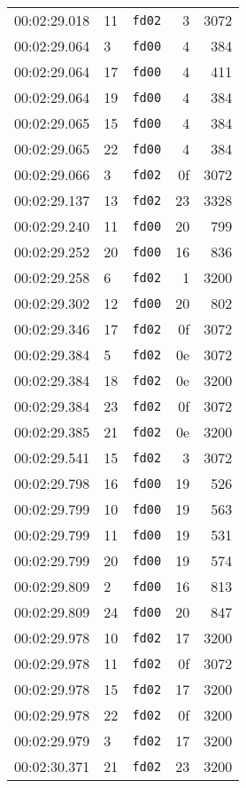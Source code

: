 \documentclass{article}
\begin{document}
\begin{longtable}{lllrr}
00:02:29.018 & 11 & \texttt{fd02} & 3 & 3072 \\
00:02:29.064 & 3 & \texttt{fd00} & 4 & 384 \\
00:02:29.064 & 17 & \texttt{fd00} & 4 & 411 \\
00:02:29.064 & 19 & \texttt{fd00} & 4 & 384 \\
00:02:29.065 & 15 & \texttt{fd00} & 4 & 384 \\
00:02:29.065 & 22 & \texttt{fd00} & 4 & 384 \\
00:02:29.066 & 3 & \texttt{fd02} & 0f & 3072 \\
00:02:29.137 & 13 & \texttt{fd02} & 23 & 3328 \\
00:02:29.240 & 11 & \texttt{fd00} & 20 & 799 \\
00:02:29.252 & 20 & \texttt{fd00} & 16 & 836 \\
00:02:29.258 & 6 & \texttt{fd02} & 1 & 3200 \\
00:02:29.302 & 12 & \texttt{fd00} & 20 & 802 \\
00:02:29.346 & 17 & \texttt{fd02} & 0f & 3072 \\
00:02:29.384 & 5 & \texttt{fd02} & 0e & 3072 \\
00:02:29.384 & 18 & \texttt{fd02} & 0e & 3200 \\
00:02:29.384 & 23 & \texttt{fd02} & 0f & 3072 \\
00:02:29.385 & 21 & \texttt{fd02} & 0e & 3200 \\
00:02:29.541 & 15 & \texttt{fd02} & 3 & 3072 \\
00:02:29.798 & 16 & \texttt{fd00} & 19 & 526 \\
00:02:29.799 & 10 & \texttt{fd00} & 19 & 563 \\
00:02:29.799 & 11 & \texttt{fd00} & 19 & 531 \\
00:02:29.799 & 20 & \texttt{fd00} & 19 & 574 \\
00:02:29.809 & 2 & \texttt{fd00} & 16 & 813 \\
00:02:29.809 & 24 & \texttt{fd00} & 20 & 847 \\
00:02:29.978 & 10 & \texttt{fd02} & 17 & 3200 \\
00:02:29.978 & 11 & \texttt{fd02} & 0f & 3072 \\
00:02:29.978 & 15 & \texttt{fd02} & 17 & 3200 \\
00:02:29.978 & 22 & \texttt{fd02} & 0f & 3200 \\
00:02:29.979 & 3 & \texttt{fd02} & 17 & 3200 \\
00:02:30.371 & 21 & \texttt{fd02} & 23 & 3200 \\

\end{longtable}
\end{document}
